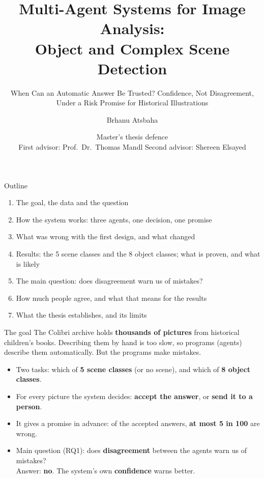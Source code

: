 \documentclass[aspectratio=169,11pt]{beamer}
\title{Multi-Agent Systems for Image Analysis:\\Object and Complex Scene Detection}
\subtitle{When Can an Automatic Answer Be Trusted? Confidence, Not Disagreement, Under a Risk Promise for Historical Illustrations}
\author{Brhanu Atsbaha}
\date{Master's thesis defence\\[6pt]
\small First advisor: Prof.\ Dr.\ Thomas Mandl \quad Second advisor: Shereen Elsayed}
\newcommand{\remark}[1]{\par\vspace{0.35cm}{\small\textcolor{grey}{#1}}}
\begin{document}
\begin{frame}[plain]
  \titlepage
\end{frame}

\begin{frame}{Outline}
\begin{enumerate}\setlength\itemsep{7pt}
  \item The goal, the data and the question
  \item How the system works: three agents, one decision, one promise
  \item What was wrong with the first design, and what changed
  \item Results: the 5 scene classes and the 8 object classes; what is proven, and what is likely
  \item The main question: does disagreement warn us of mistakes?
  \item How much people agree, and what that means for the results
  \item What the thesis establishes, and its limits
\end{enumerate}
\end{frame}

\begin{frame}{The goal}
The Colibri archive holds \textbf{thousands of pictures} from historical children's books. Describing them by hand is too slow, so programs (agents) describe them automatically. But the programs make mistakes.
\vspace{0.3cm}
\begin{itemize}\setlength\itemsep{8pt}
  \item Two tasks: which of \textbf{5 scene classes} (or no scene), and which of \textbf{8 object classes}.
  \item For every picture the system decides: \textbf{accept the answer}, or \textbf{send it to a person}.
  \item It gives a promise in advance: of the accepted answers, \textbf{at most 5 in 100} are wrong.
  \item Main question (RQ1): does \textbf{disagreement} between the agents warn us of mistakes?\\
        Answer: \textbf{no}. The system's own \textbf{confidence} warns better.
\end{itemize}
\remark{The contribution is not a better detector; it is knowing which answers can be trusted.}
\end{frame}
\end{document}
